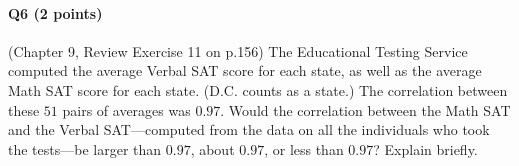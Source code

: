 \documentclass[11pt]{article}
\begin{document}
\paragraph{Q6 (2 points)} (Chapter 9, Review Exercise 11 on p.156) The Educational Testing Service computed the average Verbal SAT score for each state, as well as the average
Math SAT score for each state. (D.C. counts as a state.) The correlation between these $51$ pairs of averages was $0.97$. Would the correlation
between the Math SAT and the Verbal SAT—computed from the data on all
the individuals who took the tests—be larger than $0.97$, about $0.97$, or less
than $0.97$? Explain briefly.
\end{document}
